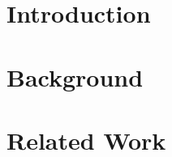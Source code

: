 \documentclass{Configuration_Files/PoliMi3i_thesis}
\begin{document}
%
%
%    
%

    \mainmatter %


    \chapter{Introduction}
    \label{ch:chapter_one}%
    



    \chapter{Background}
    \label{ch:chapter_two}%
    



    \chapter{Related Work}
    \label{ch:chapter_three}%
    
\end{document}
